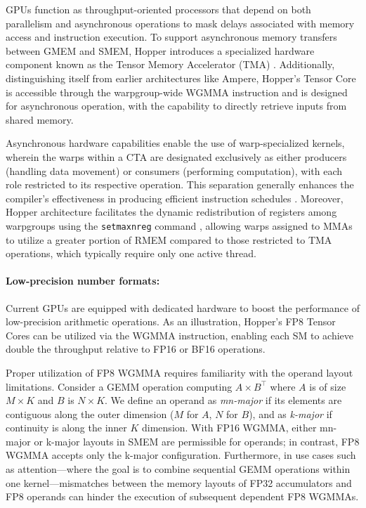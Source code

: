 GPUs function as throughput-oriented processors that depend on both parallelism and asynchronous operations to mask delays associated with memory access and instruction execution. To support asynchronous memory transfers between GMEM and SMEM, Hopper introduces a specialized hardware component known as the Tensor Memory Accelerator (TMA) \cite[\S7.29]{cuda}. Additionally, distinguishing itself from earlier architectures like Ampere, Hopper's Tensor Core is accessible through the warpgroup-wide WGMMA instruction \cite[\S9.7.14]{ptx} and is designed for asynchronous operation, with the capability to directly retrieve inputs from shared memory.

Asynchronous hardware capabilities enable the use of warp-specialized kernels, wherein the warps within a CTA are designated exclusively as either producers (handling data movement) or consumers (performing computation), with each role restricted to its respective operation. This separation generally enhances the compiler’s effectiveness in producing efficient instruction schedules \citep{warp-specialization-2011}. Moreover, Hopper architecture facilitates the dynamic redistribution of registers among warpgroups using the \verb|setmaxnreg| command \cite[\S9.7.17.1]{ptx}, allowing warps assigned to MMAs to utilize a greater portion of RMEM compared to those restricted to TMA operations, which typically require only one active thread.

\paragraph{Low-precision number formats:}
\label{sec:low-precision-gpu}
Current GPUs are equipped with dedicated hardware to boost the performance of low-precision arithmetic operations. As an illustration, Hopper’s FP8 Tensor Cores can be utilized via the WGMMA instruction, enabling each SM to achieve double the throughput relative to FP16 or BF16 operations.

Proper utilization of FP8 WGMMA requires familiarity with the operand layout limitations. Consider a GEMM operation computing $A \times B^{\top}$ where $A$ is of size $M\times K$ and $B$ is $N\times K$. We define an operand as \emph{mn-major} if its elements are contiguous along the outer dimension ($M$ for $A$, $N$ for $B$), and as \emph{k-major} if continuity is along the inner $K$ dimension. With FP16 WGMMA, either mn-major or k-major layouts in SMEM are permissible for operands; in contrast, FP8 WGMMA accepts only the k-major configuration. Furthermore, in use cases such as attention—where the goal is to combine sequential GEMM operations within one kernel—mismatches between the memory layouts of FP32 accumulators and FP8 operands can hinder the execution of subsequent dependent FP8 WGMMAs.

